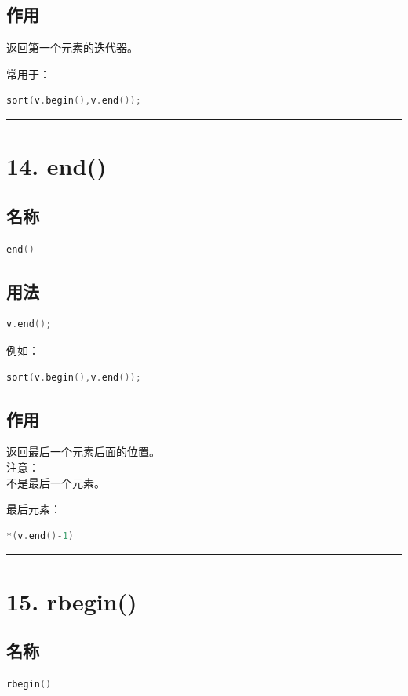 \documentclass[9pt,twocolumn]{extarticle}
\begin{document}
\subsection{作用}
返回第一个元素的迭代器。

常用于：
\begin{lstlisting}[language=C++]
sort(v.begin(),v.end());
\end{lstlisting}

\noindent\rule{\linewidth}{0.4pt}

\section{14. end()}

\subsection{名称}
\begin{lstlisting}[language=C++]
end()
\end{lstlisting}

\subsection{用法}
\begin{lstlisting}[language=C++]
v.end();
\end{lstlisting}
例如：
\begin{lstlisting}[language=C++]
sort(v.begin(),v.end());
\end{lstlisting}

\subsection{作用}
返回最后一个元素后面的位置。\\
注意：\\
不是最后一个元素。

最后元素：
\begin{lstlisting}[language=C++]
*(v.end()-1)
\end{lstlisting}

\noindent\rule{\linewidth}{0.4pt}

\section{15. rbegin()}

\subsection{名称}
\begin{lstlisting}[language=C++]
rbegin()
\end{lstlisting}
\end{document}
